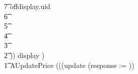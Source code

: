 \begin{circus}
                    \t7 offdisplay.uid \then \Skip \\
                    \t6 \circfi \\
                \t5 \circfi \\
            \t4 \circfi \\
        \t3 \circfi \\
        \t2 )) \circhide \lchanset display \rchanset) \\
%
        \t1 AUpdatePrice \circdef (((update \then (response := \emptyset)) \circseq \\

\end{circus}
